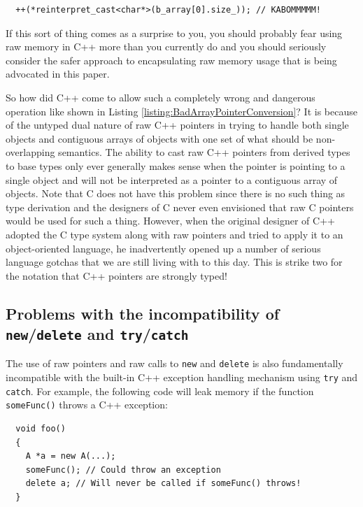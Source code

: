 \documentclass[pdf,ps2pdf,11pt]{SANDreport}
\begin{document}
{\small\begin{verbatim}
  ++(*reinterpret_cast<char*>(b_array[0].size_)); // KABOMMMMM!
\end{verbatim}}

If this sort of thing comes as a surprise to you, you should probably
fear using raw memory in C++ more than you currently do and you should
seriously consider the safer approach to encapsulating raw memory
usage that is being advocated in this paper.

So how did C++ come to allow such a completely wrong and dangerous
operation like shown in Listing
{}\ref{listing:BadArrayPointerConversion}?  It is because of the
untyped dual nature of raw C++ pointers in trying to handle both
single objects and contiguous arrays of objects with one set of what
should be non-overlapping semantics.  The ability to cast raw C++
pointers from derived types to base types only ever generally makes
sense when the pointer is pointing to a single object and will not be
interpreted as a pointer to a contiguous array of objects.  Note that
C does not have this problem since there is no such thing as type
derivation and the designers of C never even envisioned that raw C
pointers would be used for such a thing.  However, when the original
designer of C++ adopted the C type system along with raw pointers and
tried to apply it to an object-oriented language, he inadvertently
opened up a number of serious language gotchas that we are still
living with to this day.  This is strike two for the notation that C++
pointers are strongly typed!


%
{}\subsection{Problems with the incompatibility of
{}\texttt{new}/{}\texttt{delete} and {}\texttt{try}/{}\texttt{catch}}
%

The use of raw pointers and raw calls to {}\texttt{new} and
{}\texttt{delete} is also fundamentally incompatible with the built-in
C++ exception handling mechanism using {}\texttt{try} and
{}\texttt{catch}.  For example, the following code will leak memory
if the function {}\texttt{someFunc()} throws a C++ exception:

{\small\begin{verbatim}
  void foo()
  {
    A *a = new A(...);
    someFunc(); // Could throw an exception
    delete a; // Will never be called if someFunc() throws!
  }
\end{verbatim}}
\end{document}
